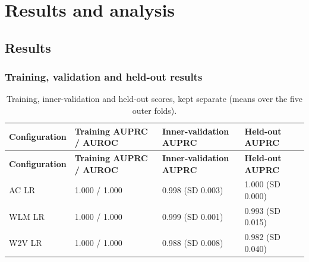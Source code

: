 \documentclass[11pt,a4paper]{article}
\begin{document}
\section{Results and analysis}\label{sec:results-analysis}
\subsection{Results}\label{sec:results}
\subsubsection{Training, validation and held-out results}
\begin{center}\small\renewcommand{\arraystretch}{1.15}
\begin{longtable}{>{\raggedright\arraybackslash}p{3.71cm}>{\raggedright\arraybackslash}p{3.71cm}>{\raggedright\arraybackslash}p{3.71cm}>{\raggedright\arraybackslash}p{3.71cm}}
\caption{Training, inner-validation and held-out scores, kept separate (means over the five outer folds).}\\
\toprule
\textbf{\hspace{0pt}Configuration} & \textbf{\hspace{0pt}Training AUPRC /\allowbreak{} AUROC} & \textbf{\hspace{0pt}Inner-validation AUPRC} & \textbf{\hspace{0pt}Held-out AUPRC}\\\midrule\endfirsthead
\toprule
\textbf{\hspace{0pt}Configuration} & \textbf{\hspace{0pt}Training AUPRC /\allowbreak{} AUROC} & \textbf{\hspace{0pt}Inner-validation AUPRC} & \textbf{\hspace{0pt}Held-out AUPRC}\\\midrule\endhead
\bottomrule\endfoot
\hspace{0pt}AC LR & \hspace{0pt}1.000 /\allowbreak{} 1.000 & \hspace{0pt}0.998 (SD 0.003) & \hspace{0pt}1.000 (SD 0.000)\\
\hspace{0pt}WLM LR & \hspace{0pt}1.000 /\allowbreak{} 1.000 & \hspace{0pt}0.999 (SD 0.001) & \hspace{0pt}0.993 (SD 0.015)\\
\hspace{0pt}W2V LR & \hspace{0pt}1.000 /\allowbreak{} 1.000 & \hspace{0pt}0.988 (SD 0.008) & \hspace{0pt}0.982 (SD 0.040)\\

\end{longtable}
\end{center}
\end{document}
